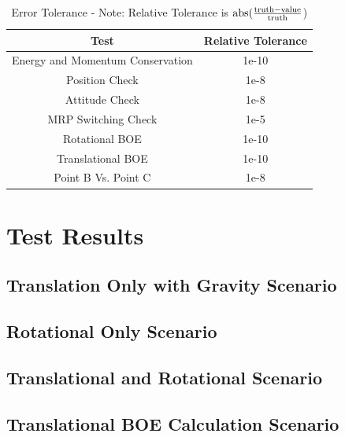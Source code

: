 \begin{table}[htbp]
	\caption{Error Tolerance - Note: Relative Tolerance is $\textnormal{abs}(\frac{\textnormal{truth} - \textnormal{value}}{\textnormal{truth}}$)}
	\label{tab:errortol}
	\centering \fontsize{10}{10}\selectfont
	\begin{tabular}{ c | c } %
		\hline
		\textbf{Test}   & \textbf{Relative Tolerance} \\
		\hline
		Energy and Momentum Conservation & 1e-10 \\
		Position Check & 1e-8 \\
		Attitude Check & 1e-8 \\
		MRP Switching Check & 1e-5 \\
		Rotational BOE & 1e-10 \\
		Translational BOE & 1e-10 \\
		Point B Vs. Point C & 1e-8 \\
		\hline	
	\end{tabular}
\end{table}

\clearpage

\section{Test Results}

\subsection{Translation Only with Gravity Scenario}


\clearpage

\subsection{Rotational Only Scenario}





\clearpage

\subsection{Translational and Rotational Scenario}




\clearpage

\subsection{Translational BOE Calculation Scenario}


\clearpage
